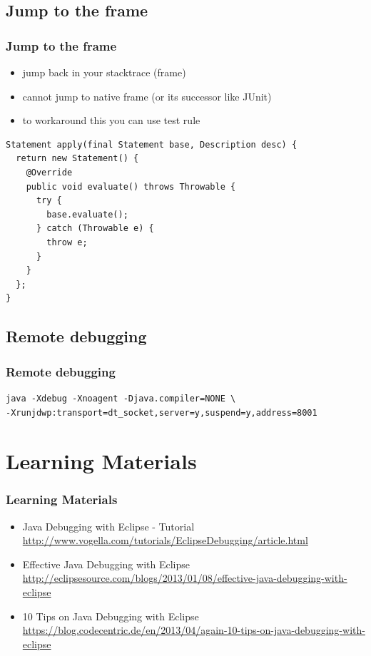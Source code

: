\documentclass{beamer}
\begin{document}
\subsection{Jump to the frame}
\begin{frame}[fragile]
\frametitle{Jump to the frame}
\begin{itemize}
\item jump back in your stacktrace (frame)
\item cannot jump to native frame (or its successor like JUnit)
  \pause
\item to workaround this you can use test rule
\end{itemize}
\vspace{0.2cm}
\begin{lstlisting}
Statement apply(final Statement base, Description desc) {
  return new Statement() {
    @Override
    public void evaluate() throws Throwable {
      try {
        base.evaluate();
      } catch (Throwable e) {
        throw e;
      }
    }
  };
}
\end{lstlisting}
\end{frame}

\subsection{Remote debugging}
\begin{frame}[fragile]
\frametitle{Remote debugging}
\begin{lstlisting}
java -Xdebug -Xnoagent -Djava.compiler=NONE \
-Xrunjdwp:transport=dt_socket,server=y,suspend=y,address=8001
\end{lstlisting}
\end{frame}

\section{Learning Materials}
\begin{frame}[fragile]
\frametitle{Learning Materials}
\begin{itemize}
\item Java Debugging with Eclipse - Tutorial\\\url{http://www.vogella.com/tutorials/EclipseDebugging/article.html}
\item Effective Java Debugging with Eclipse\\\url{http://eclipsesource.com/blogs/2013/01/08/effective-java-debugging-with-eclipse}
\item 10 Tips on Java Debugging with Eclipse\\\url{https://blog.codecentric.de/en/2013/04/again-10-tips-on-java-debugging-with-eclipse}
\end{itemize}
\end{frame}
\end{document}
